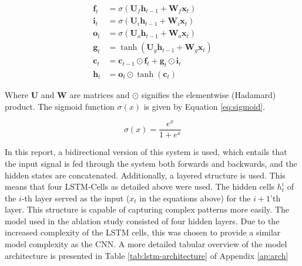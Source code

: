 \documentclass[12pt,a4paper,english]{article}
\begin{document}
\begin{align}
    \boldsymbol{f}_t &= \sigma(\boldsymbol{U}_f\boldsymbol{h}_{t-1} + \boldsymbol{W}_f\boldsymbol{x}_t) \\
    \boldsymbol{i}_t &= \sigma(\boldsymbol{U}_i\boldsymbol{h}_{t-1} + \boldsymbol{W}_i\boldsymbol{x}_t) \\
    \boldsymbol{o}_t &= \sigma(\boldsymbol{U}_o\boldsymbol{h}_{t-1} + \boldsymbol{W}_o\boldsymbol{x}_t) \\
    \boldsymbol{g}_t &= \tanh(\boldsymbol{U}_g\boldsymbol{h}_{t-1} + \boldsymbol{W}_g\boldsymbol{x}_t) \\
    \boldsymbol{c}_t &= \boldsymbol{c}_{t-1} \odot \boldsymbol{f}_t + \boldsymbol{g}_t\odot \boldsymbol{i}_t \\
    \boldsymbol{h}_t &= \boldsymbol{o}_t \odot \tanh(\boldsymbol{c}_t)
\end{align}

Where $\boldsymbol{U}$ and $\boldsymbol{W}$ are matrices and $\odot$ signifies the elementwise (Hadamard) product. The sigmoid function $\sigma(x)$ is given by Equation \eqref{eq:sigmoid}.

\begin{equation}
    \sigma(x) = \dfrac{e^x}{1+e^x}
    \label{eq:sigmoid}
\end{equation}

In this report, a bidirectional version of this system is used, which entails that the input signal is fed through the system both forwards and backwards, and the hidden states are concatenated. Additionally, a layered structure is used. This means that four LSTM-Cells as detailed above were used. The hidden cells $h_{t}^i$ of the $i$-th layer served as the input ($x_t$ in the equations above) for the  $i+1$'th layer. This structure is capable of capturing complex patterns more easily. The model used in the ablation study consisted of four hidden layers. Due to the increased complexity of the LSTM cells, this was chosen to provide a similar model complexity as the CNN. A more detailed tabular overview of the model architecture is presented in Table \ref{tab:lstm-architecture} of Appendix \ref{ap:arch}
\end{document}
